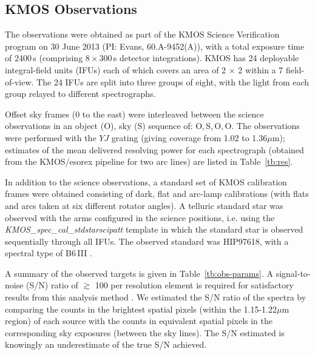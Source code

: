 
\subsection{KMOS Observations} %
\label{sub:observations}

The observations were obtained as part of the KMOS Science Verification program on 30 June 2013 (PI: Evans, 60.A-9452(A)),
with a total exposure time of 2400\,s
(comprising 8\,$\times$\,300\,s detector integrations).
KMOS has 24 deployable integral-field units (IFUs) each of which covers an area of
2 $\times$ 2 within a 7 field-of-view.
The 24 IFUs are split into three groups of eight, with the light from each group relayed to different spectrographs.

Offset sky frames
(0 to the east) were interleaved between the science observations in an object (O), sky (S) sequence of:
O,\,S,\,O,\,O.
The observations were performed with the $YJ$ grating
(giving coverage from 1.02 to 1.36$\mu$m);
estimates of the mean delivered resolving power for each spectrograph (obtained from the KMOS/esorex pipeline for two arc lines) are listed in Table~\ref{tb:res}.

In addition to the science observations, a standard set of KMOS calibration frames were obtained consisting of dark, flat and arc-lamp calibrations (with flats and arcs taken at six different rotator angles).
A telluric standard star was observed with the arms configured in the science positions, i.e. using the {\em KMOS\_spec\_cal\_stdstarscipatt} template in which the standard star is observed sequentially through all IFUs.
The observed standard was HIP97618, with a spectral type of B6\,III
\citep{1988mcts.book.....H}.

A summary of the observed targets is given in
Table~\ref{tb:obs-params}.
A signal-to-noise (S/N) ratio of $\gtrsim$ 100 per resolution element is required for satisfactory results from this analysis method
\citep[see][]{2014ApJ...788...58G}.
We estimated the S/N ratio of the spectra by comparing the counts in the brightest spatial pixels
(within the 1.15-1.22$\mu$m region) of each source with the counts in equivalent spatial pixels in the corresponding sky exposures
(between the sky lines).
The S/N estimated is knowingly an underestimate of the true S/N achieved.


